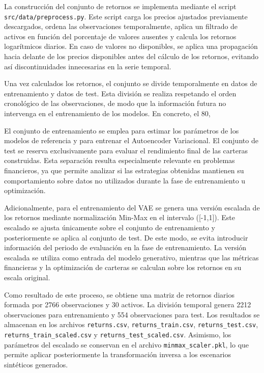 La construcción del conjunto de retornos se implementa mediante el script \texttt{src/data/preprocess.py}. Este script carga los precios ajustados previamente descargados, ordena las observaciones temporalmente, aplica un filtrado de activos en función del porcentaje de valores ausentes y calcula los retornos logarítmicos diarios. En caso de valores no disponibles, se aplica una propagación hacia delante de los precios disponibles antes del cálculo de los retornos, evitando así discontinuidades innecesarias en la serie temporal.

Una vez calculados los retornos, el conjunto se divide temporalmente en datos de entrenamiento y datos de test. Esta división se realiza respetando el orden cronológico de las observaciones, de modo que la información futura no intervenga en el entrenamiento de los modelos. En concreto, el 80,%

El conjunto de entrenamiento se emplea para estimar los parámetros de los modelos de referencia y para entrenar el Autoencoder Variacional. El conjunto de test se reserva exclusivamente para evaluar el rendimiento final de las carteras construidas. Esta separación resulta especialmente relevante en problemas financieros, ya que permite analizar si las estrategias obtenidas mantienen su comportamiento sobre datos no utilizados durante la fase de entrenamiento u optimización.

Adicionalmente, para el entrenamiento del VAE se genera una versión escalada de los retornos mediante normalización Min-Max en el intervalo ([-1,1]). Este escalado se ajusta únicamente sobre el conjunto de entrenamiento y posteriormente se aplica al conjunto de test. De este modo, se evita introducir información del periodo de evaluación en la fase de entrenamiento. La versión escalada se utiliza como entrada del modelo generativo, mientras que las métricas financieras y la optimización de carteras se calculan sobre los retornos en su escala original.

Como resultado de este proceso, se obtiene una matriz de retornos diarios formada por 2766 observaciones y 30 activos. La división temporal genera 2212 observaciones para entrenamiento y 554 observaciones para test. Los resultados se almacenan en los archivos \texttt{returns.csv}, \texttt{returns\_train.csv}, \texttt{returns\_test.csv}, \texttt{returns\_train\_scaled.csv} y \texttt{returns\_test\_scaled.csv}. Asimismo, los parámetros del escalado se conservan en el archivo \texttt{minmax\_scaler.pkl}, lo que permite aplicar posteriormente la transformación inversa a los escenarios sintéticos generados.

